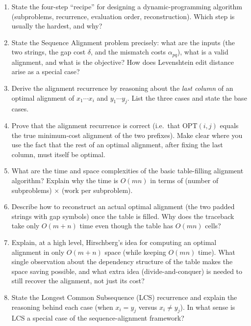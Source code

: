 \documentclass[11pt]{article}
\begin{document}
\begin{enumerate}[label=\textbf{A\arabic*.}, leftmargin=2.2em]

\item State the four-step ``recipe'' for designing a dynamic-programming algorithm
(subproblems, recurrence, evaluation order, reconstruction). Which step is usually the
hardest, and why?

\item State the Sequence Alignment problem precisely: what are the inputs (the two strings,
the gap cost $\delta$, and the mismatch costs $\alpha_{pq}$), what is a valid alignment, and
what is the objective? How does Levenshtein edit distance arise as a special case?

\item Derive the alignment recurrence by reasoning about the \emph{last column} of an
optimal alignment of $x_1\cdots x_i$ and $y_1\cdots y_j$. List the three cases and state the
base cases.

\item Prove that the alignment recurrence is correct (i.e.\ that $\mathrm{OPT}(i,j)$ equals
the true minimum-cost alignment of the two prefixes). Make clear where you use the fact that
the rest of an optimal alignment, after fixing the last column, must itself be optimal.

\item What are the time and space complexities of the basic table-filling alignment
algorithm? Explain why the time is $O(mn)$ in terms of (number of subproblems) $\times$
(work per subproblem).

\item Describe how to reconstruct an actual optimal alignment (the two padded strings with
gap symbols) once the table is filled. Why does the traceback take only $O(m+n)$ time even
though the table has $O(mn)$ cells?

\item Explain, at a high level, Hirschberg's idea for computing an optimal alignment in only
$O(m+n)$ space (while keeping $O(mn)$ time). What single observation about the dependency
structure of the table makes the space saving possible, and what extra idea
(divide-and-conquer) is needed to still recover the alignment, not just its cost?

\item State the Longest Common Subsequence (LCS) recurrence and explain the reasoning behind
each case (when $x_i = y_j$ versus $x_i \ne y_j$). In what sense is LCS a special case of the
sequence-alignment framework?


\end{enumerate}
\end{document}
